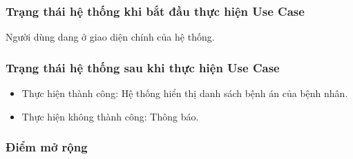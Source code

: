 \subsubsection{Trạng thái hệ thống khi bắt đầu thực hiện Use Case}
Người dùng dang ở giao diện chính của hệ thống.

\subsubsection{Trạng thái hệ thống sau khi thực hiện Use Case}
\begin{itemize}
  \item Thực hiện thành công: Hệ thống hiển thị danh sách bệnh án của bệnh nhân.
  \item Thực hiện không thành công: Thông báo.
\end{itemize}

\subsubsection{Điểm mở rộng}